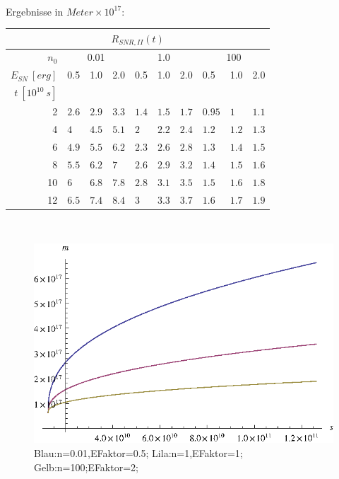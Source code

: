 \\
Ergebnisse in $Meter \times 10^{17}$:
\begin{center}
\begin{tabular}{|r|l|l|l|l|l|l|l|l|l|}
\multicolumn{10}{c}{\(R_{SNR,II}(t)\)}\\
\hline
\(n_0\) & \multicolumn{3}{|c|}{0.01} & \multicolumn{3}{|c|}{1.0} & \multicolumn{3}{|c|}{100}\\
\hline
\(E_{SN}~[erg]\) & 0.5 & 1.0 & 2.0 & 0.5 & 1.0 & 2.0 & 0.5 & 1.0 & 2.0\\
\hline
\(t~[10^{10}~s]\) & & & & & & & & & \\
\cline{1-1}
2 & $2.6$ & $2.9$ & $3.3$ &
$1.4$ & $1.5$ & $1.7$ &
$0.95$ & $1$ & $1.1$ \\

4 & $4$ & $4.5$ & $5.1$ &
$2$ & $2.2$ & $2.4$ &
$1.2$ & $1.2$ & $1.3$ \\

6 & $4.9$ & $5.5$ & $6.2$ &
$2.3$ & $2.6$ & $2.8$ &
$1.3$ & $1.4$ & $1.5$\\

8 & $5.5$ & $6.2$ & $7$ &
$2.6$ & $2.9$ & $3.2$ &
$1.4$ & $1.5$ & $1.6$\\

10 & $6$ & $6.8$ & $7.8$ &
$2.8$ & $3.1$ & $3.5$ &
$1.5$ & $1.6$ & $1.8$ \\

12 & $6.5$ & $7.4$ & $8.4$&
$3$ & $3.3$ & $3.7$ &
$1.6$ & $1.7$ & $1.9$ \\

\hline
\end{tabular}\\
\end{center}
\begin{figure}[ht]
\begin{center}
\includegraphics{aufgabe6r.eps}
\end{center}
\caption[Bildunterschrift]{Blau:n=0.01,EFaktor=0.5; Lila:n=1,EFaktor=1; Gelb:n=100;EFaktor=2;}
\end{figure}

